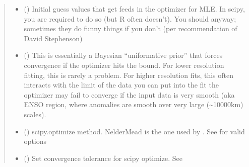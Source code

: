\documentclass[letterpaper,10pt,english]{sphinxmanual}
\begin{document}
\begin{fulllineitems}
\begin{fulllineitems}
\begin{quote}
\begin{description}
\begin{itemize}
\sphinxAtStartPar
The modified “Modified\_Met\_Office” is a variation to that,
but allow the tin can get squished at the poles.
(Sinusoidal projection). This does results in a problem:
the zonal displacement now depends in which latitude
you compute on (at the beginning latitude or at the end latitude).
Here we take the average of the two.


\item {}
\sphinxAtStartPar
{} () \textendash{} Initial guess values that get feeds in the optimizer for MLE.
In scipy, you are required to do so (but R often doesn’t).
You should anyway; sometimes they do funny things
if you don’t (per recommendation of David Stephenson)

\item {}
\sphinxAtStartPar
{} () \textendash{} This is essentially a Bayesian “uniformative prior”
that forces convergence if the optimizer hits the bound.
For lower resolution fitting, this is rarely a problem.
For higher resolution fits, this often interacts with
the limit of the data you can put into the fit the optimizer
may fail to converge if the input data is very smooth (aka ENSO
region, where anomalies are smooth over very large (\textasciitilde{}10000km)
scales).

\item {}
\sphinxAtStartPar
{} () \textendash{} scipy.optimize method. Nelder\sphinxhyphen{}Mead is the one used by .
See 
for valid options

\item {}
\sphinxAtStartPar
{} () \textendash{}
\sphinxAtStartPar
Set convergence tolerance for scipy optimize.
See 


\end{itemize}
\end{description}
\end{quote}
\end{fulllineitems}
\end{fulllineitems}
\end{document}
